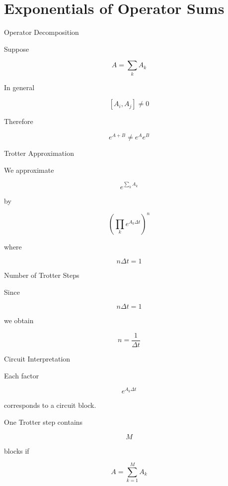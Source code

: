 \documentclass{beamer}
\begin{document}
\section{Exponentials of Operator Sums}

\begin{frame}{Operator Decomposition}

  Suppose

  \[
  A = \sum_k A_k
  \]

  In general

  \[
    [A_i,A_j] \neq 0
    \]

    Therefore

    \[
    e^{A+B} \neq e^A e^B
    \]

\end{frame}

\begin{frame}{Trotter Approximation}

  We approximate

  \[
  e^{\sum_k A_k}
  \]

  by

  \[
  \left(
  \prod_k e^{A_k\Delta t}
  \right)^n
  \]

  where

  \[
  n\Delta t = 1
  \]

\end{frame}

\begin{frame}{Number of Trotter Steps}

  Since

  \[
  n\Delta t = 1
  \]

  we obtain

  \[
  n=\frac{1}{\Delta t}
  \]

\end{frame}

\begin{frame}{Circuit Interpretation}

  Each factor

  \[
  e^{A_k\Delta t}
  \]

  corresponds to a circuit block.

  One Trotter step contains

  \[
  M
  \]

  blocks if

  \[
  A=\sum_{k=1}^M A_k
  \]

\end{frame}
\end{document}

